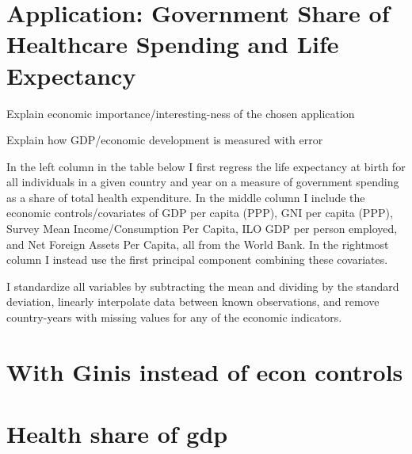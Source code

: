 \documentclass[12pt]{article}
\begin{document}
    \section*{Application: Government Share of Healthcare Spending and Life Expectancy}

        Explain economic importance/interesting-ness of the chosen application

        Explain how GDP/economic development is measured with error

        In the left column in the table below I first regress the life expectancy at birth for all individuals in a given country and year on a measure of government spending as a share of total health expenditure. In the middle column I include the economic controls/covariates of GDP per capita (PPP), GNI per capita (PPP), Survey Mean Income/Consumption Per Capita, ILO GDP per person employed, and Net Foreign Assets Per Capita, all from the World Bank. In the rightmost column I instead use the first principal component combining these covariates.

        I standardize all variables by subtracting the mean and dividing by the standard deviation, linearly interpolate data between known observations, and remove country-years with missing values for any of the economic indicators.

        





    \newpage \clearpage

    \section*{With Ginis instead of econ controls}

        

    \newpage \clearpage

    \section*{Health share of gdp}
\end{document}
